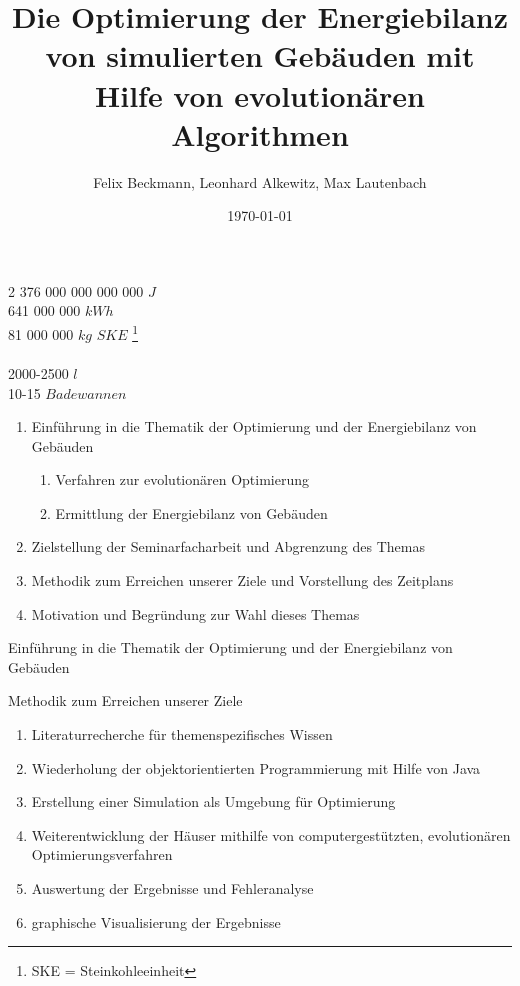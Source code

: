 \documentclass[11pt]{beamer}
\author{Felix Beckmann, Leonhard Alkewitz, Max Lautenbach}
\title{Die Optimierung der Energiebilanz von simulierten Gebäuden mit Hilfe von evolutionären Algorithmen}
\institute{Spezialschulteil des Albert-Schweizer Gymnasium Erfurt}
\date{\today}
\begin{document}
\begin{frame}
\begin{center}
\pause \huge{2 376 000 000 000 000 $J$}  \\  
\pause \huge{641 000 000 $kWh$} \\ 
\pause \huge{81 000 000 $kg$ $SKE$ \footnote{SKE = Steinkohleeinheit}} \\ 
\hrulefill{}  \\
\pause \huge{2000-2500 $l$} \\ 
\pause \huge{10-15 $Badewannen$}
\end{center}
\end{frame}

\begin{frame}
\titlepage
\end{frame}

\begin{frame}
\begin{enumerate}
\item{Einführung in die Thematik der Optimierung und der Energiebilanz von Gebäuden}
\begin{enumerate}
\item{Verfahren zur evolutionären Optimierung}
\item{Ermittlung der Energiebilanz von Gebäuden}
\end{enumerate}
\item{Zielstellung der Seminarfacharbeit und Abgrenzung des Themas}
\item{Methodik zum Erreichen unserer Ziele und Vorstellung des Zeitplans}
\item{Motivation und Begründung zur Wahl dieses Themas}
\end{enumerate}
\end{frame}

\begin{frame}{Einführung in die Thematik der Optimierung und der Energiebilanz von Gebäuden}

\end{frame}

\begin{frame}{Methodik zum Erreichen unserer Ziele}
\begin{enumerate}
\item{Literaturrecherche für themenspezifisches Wissen}
\item{Wiederholung der objektorientierten Programmierung mit Hilfe von Java}
\item{Erstellung einer Simulation als Umgebung für Optimierung}
\item{Weiterentwicklung der Häuser mithilfe von computergestützten, evolutionären Optimierungsverfahren}
\item{Auswertung der Ergebnisse und Fehleranalyse}
\item{graphische Visualisierung der Ergebnisse}
\end{enumerate}
\end{frame}
\end{document}
